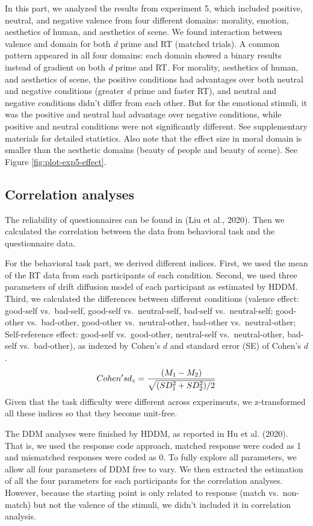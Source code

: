 \documentclass[
  english,
  man]{apa6}
\begin{document}
In this part, we analyzed the results from experiment 5, which included positive, neutral, and negative valence from four different domains: morality, emotion, aesthetics of human, and aesthetics of scene. We found interaction between valence and domain for both \emph{d} prime and RT (matched trials). A common pattern appeared in all four domains: each domain showed a binary results instead of gradient on both \emph{d} prime and RT. For morality, aesthetics of human, and aesthetics of scene, the positive conditions had advantages over both neutral and negative conditions (greater \emph{d} prime and faster RT), and neutral and negative conditions didn't differ from each other. But for the emotional stimuli, it was the positive and neutral had advantage over negative conditions, while positive and neutral conditions were not significantly different. See supplementary materials for detailed statistics. Also note that the effect size in moral domain is smaller than the aesthetic domains (beauty of people and beauty of scene). See Figure \ref{fig:plot-exp5-effect}.

\hypertarget{correlation-analyses}{%
\subsection{Correlation analyses}\label{correlation-analyses}}

The reliability of questionnaires can be found in (Liu et al., 2020). Then we calculated the correlation between the data from behavioral task and the questionnaire data.

For the behavioral task part, we derived different indices. First, we used the mean of the RT data from each participants of each condition. Second, we used three parameters of drift diffusion model of each participant as estimated by HDDM. Third, we calculated the differences between different conditions (valence effect: good-self vs.~bad-self, good-self vs.~neutral-self, bad-self vs.~neutral-self; good-other vs.~bad-other, good-other vs.~neutral-other, bad-other vs.~neutral-other; Self-reference effect: good-self vs.~good-other, neutral-self vs.~neutral-other, bad-self vs.~bad-other), as indexed by Cohen's \(d\) and standard error (SE) of Cohen's \(d\).
\[ Cohen's \space d_{z} = \frac {(M_{1} - M_{2})} {\sqrt{(SD_{1}^2 + SD_{2}^2)/2}}\]
Given that the task difficulty were different across experiments, we z-transformed all these indices so that they become unit-free.

The DDM analyses were finished by HDDM, as reported in Hu et al. (2020). That is, we used the response code approach, matched response were coded as 1 and mismatched responses were coded as 0. To fully explore all parameters, we allow all four parameters of DDM free to vary. We then extracted the estimation of all the four parameters for each participants for the correlation analyses. However, because the starting point is only related to response (match vs.~non-match) but not the valence of the stimuli, we didn't included it in correlation analysis.
\end{document}
